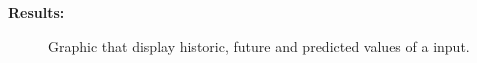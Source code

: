 \textbf{Results:}\\
\begin{figure}[H]
	\centering
    \caption{Graphic that display historic, future and predicted values of a input.}
\end{figure}

